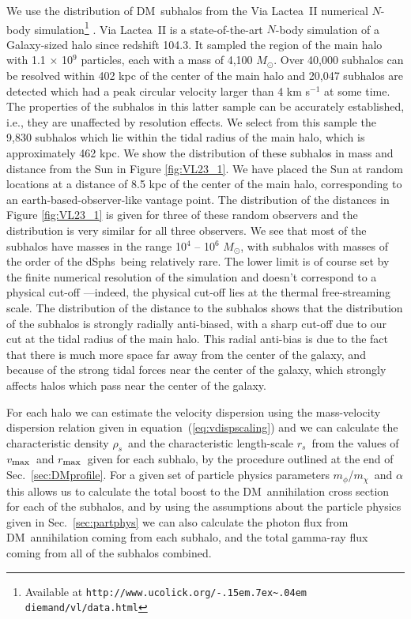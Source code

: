 \documentclass[aps,prd,twocolumn,amsmath,amssymb,floatfix,nofootinbib,10pt]{revtex4}
\newcommand{\ie}{i.e.}
\newcommand{\VL}{Via Lactea}
\newcommand{\DM}{DM}
\newcommand{\mdm}{\ensuremath{m_{\chi}}}
\newcommand{\mv}{\ensuremath{m_{\phi}}}
\newcommand{\eqnname}{equation}
\newcommand{\rhos}{\ensuremath{\rho_s}}
\newcommand{\rs}{\ensuremath{r_s}}
\newcommand{\Msol}{\ensuremath{M_{\odot}}}
\newcommand{\Msun}{\Msol}
\newcommand{\vmax}{\ensuremath{v_{\mbox{{\footnotesize max}}}}}
\newcommand{\rmax}{\ensuremath{r_{\mbox{{\footnotesize max}}}}}
\newcommand{\dSphs}{dSphs}
\def\urltilda{\kern -.15em\lower .7ex\hbox{\~{}}\kern .04em}
\begin{document}
We use the distribution of \DM\ subhalos from the \VL\ II numerical
$N$-body simulation\footnote{Available at
\texttt{http://www.ucolick.org/\urltilda$\!$diemand/vl/data.html}}
\cite{2008Natur.454..735D}. \VL\ II is a state-of-the-art $N$-body
simulation of a Galaxy-sized halo since redshift 104.3. It sampled the
region of the main halo with 1.1 $\times$ 10$^9$ particles, each with
a mass of 4,100 \Msun. Over 40,000 subhalos can be resolved within 402
kpc of the center of the main halo and 20,047 subhalos are detected
which had a peak circular velocity larger than 4 km s$^{-1}$ at some
time. The properties of the subhalos in this latter sample can be
accurately established, \ie, they are unaffected by resolution
effects. We select from this sample the 9,830 subhalos which lie
within the tidal radius of the main halo, which is approximately 462
kpc. We show the distribution of these subhalos in mass and distance
from the Sun in Figure \ref{fig:VL23_1}. We have placed the Sun at
random locations at a distance of 8.5 kpc of the center of the main
halo, corresponding to an earth-based-observer-like vantage point. The
distribution of the distances in Figure \ref{fig:VL23_1} is given for
three of these random observers and the distribution is very similar
for all three observers. We see that most of the subhalos have masses
in the range 10$^4$ -- 10$^6$ \Msun, with subhalos with masses of the
order of the \dSphs\ being relatively rare. The lower limit is of
course set by the finite numerical resolution of the simulation and
doesn't correspond to a physical cut-off ---indeed, the physical
cut-off lies at the thermal free-streaming scale. The distribution of
the distance to the subhalos shows that the distribution of the
subhalos is strongly radially anti-biased, with a sharp cut-off due to
our cut at the tidal radius of the main halo. This radial anti-bias is
due to the fact that there is much more space far away from the center
of the galaxy, and because of the strong tidal forces near the center
of the galaxy, which strongly affects halos which pass near the center
of the galaxy.

For each halo we can estimate the velocity dispersion using the
mass-velocity dispersion relation given in \eqnname\
(\ref{eq:vdispscaling}) and we can calculate the characteristic
density \rhos\ and the characteristic length-scale \rs\ from the
values of \vmax\ and \rmax\ given for each subhalo, by the procedure
outlined at the end of Sec.~\ref{sec:DMprofile}. For a given set of
particle physics parameters \mv/\mdm\ and $\alpha$ this allows us to
calculate the total boost to the \DM\ annihilation cross section for
each of the subhalos, and by using the assumptions about the particle
physics given in Sec.~\ref{sec:partphys} we can also calculate the
photon flux from \DM\ annihilation coming from each subhalo, and the
total gamma-ray flux coming from all of the subhalos combined.
\end{document}
